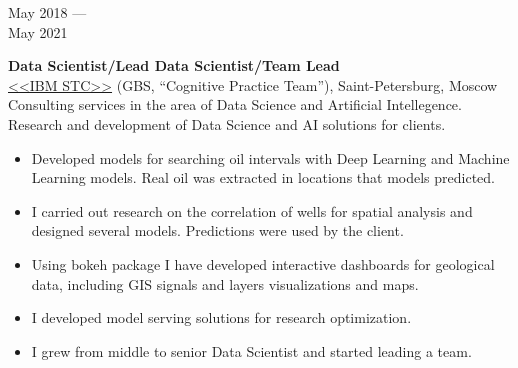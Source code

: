 \documentclass[10pt,a4paper]{article}
\newcommand{\lmpratio}{0.15}
\newcommand{\rmpratio}{0.74}
\newcommand{\vSpace}{0.5cm}
\newcommand{\horizontalSpace}{0.05\textwidth}
\newcommand{\sectionMain}[1]{\textbf{#1}}
\begin{document}
	\begin{minipage}[t]{\lmpratio\textwidth}
		May 2018 --- \\May 2021
	\end{minipage}
	\hspace{\horizontalSpace}
	\begin{minipage}[t]{\rmpratio\textwidth}
		\sectionMain{Data Scientist/Lead Data Scientist/Team Lead}\\
		\href{https://www.ibm.com/ru/rstl/index-en.html}{<<IBM STC>>} (GBS, ``Cognitive Practice Team''), Saint-Petersburg, Moscow\\[0.1cm]
  
Consulting services in the area of Data Science and Artificial Intellegence.
Research and development of Data Science and AI solutions for clients.
  
		\begin{itemize}
                \item 
Developed models for searching oil intervals with Deep Learning and Machine Learning models.
Real oil was extracted in locations that models predicted.
                \item 
I carried out research on the correlation of wells for spatial analysis and designed several models.
Predictions were used by the client.
                \item
Using bokeh package I have developed interactive dashboards for geological data, including GIS signals and layers visualizations and maps.
                \item
I developed model serving solutions for research optimization.
                \item
I grew from middle to senior Data Scientist and started leading a team.
            \end{itemize}
		
	\end{minipage}	
	\vspace{\vSpace}
	
\end{document}
